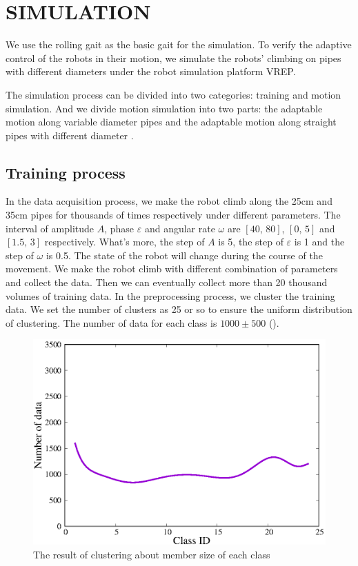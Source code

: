 \section{SIMULATION}
We use the rolling gait as the basic gait for the simulation. To verify the adaptive control of the robots in their motion, we simulate the robots' climbing on pipes with different diameters under the robot simulation platform VREP.

The simulation process can be divided into two categories: training and motion simulation. And we divide motion simulation into two parts: the adaptable motion along variable diameter pipes and the adaptable motion along straight pipes with different diameter .

\subsection{Training process}

In the data acquisition process, we make the robot climb along the 25cm and 35cm pipes for thousands of times respectively under different parameters. The interval of amplitude $A$, phase $\varepsilon$ and angular rate $\omega$ are $[40, \, 80]$, $[0, \, 5]$ and $[1.5, \, 3]$ respectively. What's more, the step of $A$ is 5, the step of $\varepsilon$ is 1 and the step of $\omega$ is 0.5. The state of the robot will change during the course of the movement. We make the robot climb with different combination of parameters and collect the data. Then we can eventually collect more than 20 thousand volumes of training data. In the preprocessing process, we cluster the training data. We set the number of clusters as 25 or so to ensure the uniform distribution of clustering. The number of data for each class is $1000 \pm 500 $ ().

\begin{figure}[t]
	\centering
	\includegraphics[width=0.6\linewidth]{fig/experiment/170912/cluster}
	\caption{The result of clustering about member size of each class}
\end{figure}

